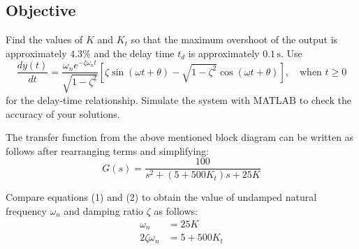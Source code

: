 \documentclass[11pt]{article}
\begin{document}
\begin{center}
\end{center}

\subsection*{Objective}
Find the values of \( K \) and \( K_t \) so that the maximum overshoot of the output is approximately \( 4.3\% \) and the delay time \( t_d \) is approximately \( 0.1 \, \text{s} \). Use 
\[
\frac{dy(t)}{dt} = \frac{\omega_n e^{-\zeta \omega_n t}}{\sqrt{1 - \zeta^2}} \left[ \zeta \sin(\omega t + \theta) - \sqrt{1 - \zeta^2} \cos(\omega t + \theta) \right], \quad \text{when } t \geq 0
\]
for the delay-time relationship.
\newline \newline
\noindent Simulate the system with MATLAB to check the accuracy of your solutions.
\newpage

The transfer function from the above mentioned block diagram can be written as follows after rearranging terms and simplifying:
\begin{equation*}
    G(s) = \frac{100}{s^2 + (5+500K_t)s + 25K}
\end{equation*}

Compare equations (1) and (2) to obtain the value of undamped natural frequency \( \omega_n \) and damping ratio \( \zeta \) as follows:
\begin{align*}
    \omega_n &= 25K \\
    2\zeta \omega_n &= 5 + 500K_t
\end{align*}
\end{document}
